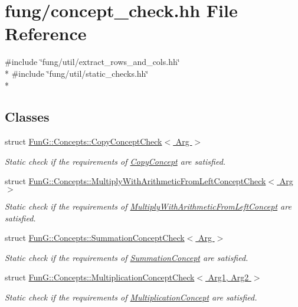 \hypertarget{concept__check_8hh}{}\section{fung/concept\+\_\+check.hh File Reference}
\label{concept__check_8hh}
{\ttfamily \#include \char`\"{}fung/util/extract\+\_\+rows\+\_\+and\+\_\+cols.\+hh\char`\"{}}\\*
{\ttfamily \#include \char`\"{}fung/util/static\+\_\+checks.\+hh\char`\"{}}\\*
\subsection*{Classes}
\begin{DoxyCompactItemize}
\item 
struct \hyperlink{structFunG_1_1Concepts_1_1CopyConceptCheck}{Fun\+G\+::\+Concepts\+::\+Copy\+Concept\+Check$<$ Arg $>$}
\begin{DoxyCompactList}\small\item\em Static check if the requirements of \hyperlink{structFunG_1_1Concepts_1_1CopyConcept}{Copy\+Concept} are satisfied. \end{DoxyCompactList}\item 
struct \hyperlink{structFunG_1_1Concepts_1_1MultiplyWithArithmeticFromLeftConceptCheck}{Fun\+G\+::\+Concepts\+::\+Multiply\+With\+Arithmetic\+From\+Left\+Concept\+Check$<$ Arg $>$}
\begin{DoxyCompactList}\small\item\em Static check if the requirements of \hyperlink{structFunG_1_1Concepts_1_1MultiplyWithArithmeticFromLeftConcept}{Multiply\+With\+Arithmetic\+From\+Left\+Concept} are satisfied. \end{DoxyCompactList}\item 
struct \hyperlink{structFunG_1_1Concepts_1_1SummationConceptCheck}{Fun\+G\+::\+Concepts\+::\+Summation\+Concept\+Check$<$ Arg $>$}
\begin{DoxyCompactList}\small\item\em Static check if the requirements of \hyperlink{structFunG_1_1Concepts_1_1SummationConcept}{Summation\+Concept} are satisfied. \end{DoxyCompactList}\item 
struct \hyperlink{structFunG_1_1Concepts_1_1MultiplicationConceptCheck}{Fun\+G\+::\+Concepts\+::\+Multiplication\+Concept\+Check$<$ Arg1, Arg2 $>$}
\begin{DoxyCompactList}\small\item\em Static check if the requirements of \hyperlink{structFunG_1_1Concepts_1_1MultiplicationConcept}{Multiplication\+Concept} are satisfied. \end{DoxyCompactList}\item 

\end{DoxyCompactItemize}
